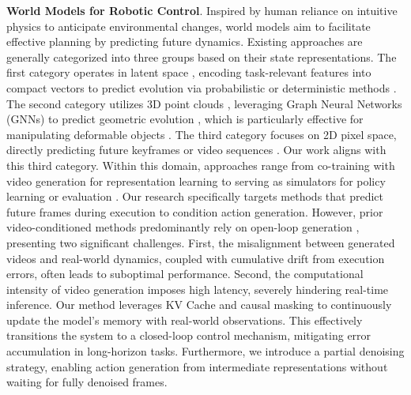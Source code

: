 \documentclass[onecolumn]{robbyant}           %
\begin{document}
\noindent \textbf{World Models for Robotic Control}.
Inspired by human reliance on intuitive physics to anticipate environmental changes, world models aim to facilitate effective planning by predicting future dynamics. Existing approaches are generally categorized into three groups based on their state representations. The first category operates in latent space \cite{watter2015embed, li2019propagation, li2024deformnet, shen2024action}, encoding task-relevant features into compact vectors to predict evolution via probabilistic \cite{li2024deformnet, wu2023daydreamer, lusch2018deep} or deterministic methods \cite{xu2019densephysnet, shen2024action}. The second category utilizes 3D point clouds \cite{shi2024robocraft, wang2023dynamic, sulsky1995application}, leveraging Graph Neural Networks (GNNs) to predict geometric evolution \cite{zhang2024adaptigraph, zhang2025particle}, which is particularly effective for manipulating deformable objects \cite{zhang2025particle, wang2023dynamic}. The third category focuses on 2D pixel space, directly predicting future keyframes or video sequences \cite{zhou2025act2goal, du2023learning, kim2026cosmos, zhou2024robodreamer}. Our work aligns with this third category. Within this domain, approaches range from co-training with video generation for representation learning \cite{uva, uwm, bu2025learning} to serving as simulators for policy learning or evaluation \cite{team2025evaluating}. Our research specifically targets methods that predict future frames during execution to condition action generation. However, prior video-conditioned methods predominantly rely on open-loop generation \cite{du2023learning, zhou2025act2goal}, presenting two significant challenges. First, the misalignment between generated videos and real-world dynamics, coupled with cumulative drift from execution errors, often leads to suboptimal performance. Second, the computational intensity of video generation imposes high latency, severely hindering real-time inference. Our method leverages KV Cache and causal masking to continuously update the model's memory with real-world observations. This effectively transitions the system to a closed-loop control mechanism, mitigating error accumulation in long-horizon tasks. Furthermore, we introduce a partial denoising strategy, enabling action generation from intermediate representations without waiting for fully denoised frames. 






\end{document}

